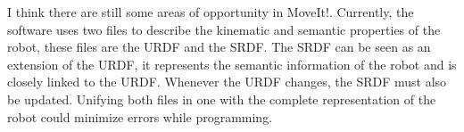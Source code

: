 I think there are still some areas of opportunity in MoveIt!. Currently, the software uses two files to describe the kinematic and semantic properties of the robot, these files are the URDF and the SRDF. The SRDF can be seen as an extension of the URDF, it represents the semantic information of the robot and is closely linked to the URDF. Whenever the URDF changes, the SRDF must also be updated. Unifying both files in one with the complete representation of the robot could minimize errors while programming.
